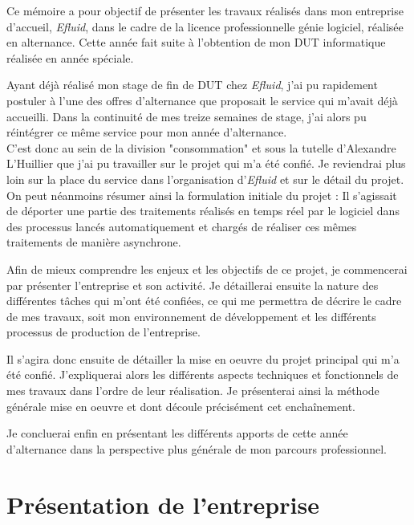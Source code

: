 \documentclass[a4paper, 12pt]{report}
\begin{document}
Ce mémoire a pour objectif de présenter les travaux réalisés dans mon entreprise d'accueil, \textit{Efluid}, dans le cadre de la licence professionnelle génie logiciel, réalisée en alternance. Cette année fait suite à l'obtention de mon DUT informatique réalisée en année spéciale.

Ayant déjà réalisé mon stage de fin de DUT chez \textit{Efluid}, j'ai pu rapidement postuler à l'une des offres d'alternance que proposait le service qui m'avait déjà accueilli. Dans la continuité de mes treize semaines de stage, j'ai alors pu réintégrer ce même service pour mon année d'alternance.\\

C'est donc au sein de la division "consommation" et sous la tutelle d'Alexandre L'Huillier que j'ai pu travailler sur le projet qui m'a été confié. Je reviendrai plus loin sur la place du service dans l'organisation d'\textit{Efluid} et sur le détail du projet. On peut néanmoins résumer ainsi la formulation initiale du projet : Il s'agissait de déporter une partie des traitements réalisés en temps réel par le logiciel dans des processus lancés automatiquement et chargés de réaliser ces mêmes traitements de manière asynchrone.

Afin de mieux comprendre les enjeux et les objectifs de ce projet, je commencerai par présenter l'entreprise et son activité. Je détaillerai ensuite la nature des différentes tâches qui m'ont été confiées, ce qui me permettra de décrire le cadre de mes travaux, soit mon environnement de développement et les différents processus de production de l'entreprise. 

Il s'agira donc ensuite de détailler la mise en oeuvre du projet principal qui m'a été confié. J'expliquerai alors les différents aspects techniques et fonctionnels de mes travaux dans l'ordre de leur réalisation. Je présenterai ainsi la méthode générale mise en oeuvre et dont découle précisément cet enchaînement. 

Je concluerai enfin en présentant les différents apports de cette année d'alternance dans la perspective plus générale de mon parcours professionnel.

\chapter{Présentation de l'entreprise}
\end{document}
